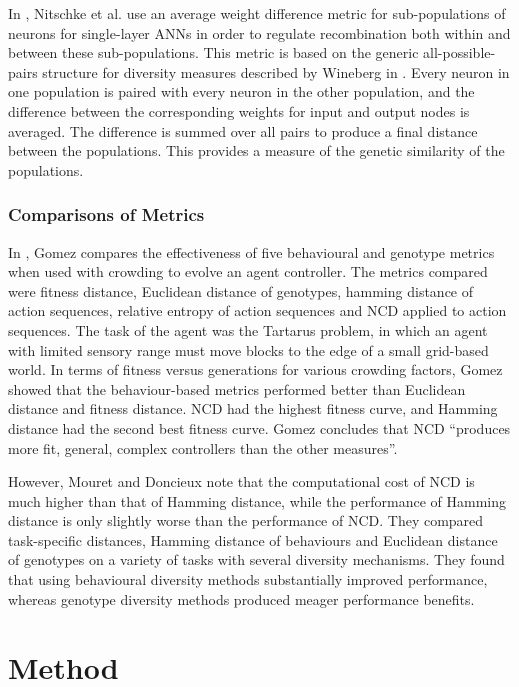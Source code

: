 \documentclass[12pt]{article} %
\begin{document}
In \cite{Nitschke2010}, Nitschke et al. use an average weight difference metric for sub-populations of neurons for single-layer ANNs in order to regulate recombination both within and between these sub-populations. This metric is based on the generic all-possible-pairs structure for diversity measures described by Wineberg in \cite{Wineberg2003}. Every neuron in one population is paired with every neuron in the other population, and the difference between the corresponding weights for input and output nodes is averaged. The difference is summed over all pairs to produce a final distance between the populations. This provides a measure of the genetic similarity of the populations.

\subsubsection{Comparisons of Metrics}

In \cite{Gomez2009}, Gomez compares the effectiveness of five behavioural and genotype metrics when used with crowding to evolve an agent controller. The metrics compared were fitness distance, Euclidean distance of genotypes, hamming distance of action sequences, relative entropy of action sequences and NCD applied to action sequences. The task of the agent was the Tartarus problem, in which an agent with limited sensory range must move blocks to the edge of a small grid-based world. In terms of fitness versus generations for various crowding factors, Gomez showed that the behaviour-based metrics performed better than Euclidean distance and fitness distance. NCD had the highest fitness curve, and Hamming distance had the second best fitness curve. Gomez concludes that NCD ``produces more fit, general, complex controllers than the other measures''.

However, Mouret and Doncieux \cite{Mouret2012} note that the computational cost of NCD is much higher than that of Hamming distance, while the performance of Hamming distance is only slightly worse than the performance of NCD. They compared task-specific distances, Hamming distance of behaviours and Euclidean distance of genotypes on a variety of tasks with several diversity mechanisms. They found that using behavioural diversity methods substantially improved performance, whereas genotype diversity methods produced meager performance benefits.

\section{Method}
\end{document}

